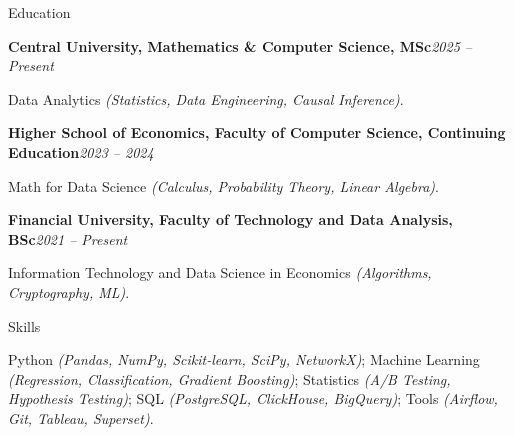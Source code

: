 \documentclass[]{mcdowellcv}
\renewenvironment{cvsubsection}[2]{%
  \begin{adjustwidth}{\subsectionmargin}{\subsectionmargin}%
    {\bfseries #1}\hfill #2\par\vspace{0.67em}%
}{%
  \end{adjustwidth}%
  \vspace*{\aftersubsectionspace}%
}
\begin{document}
	\begin{cvsection}{\Large Education}
		\begin{cvsubsection}{Central University, Mathematics \& Computer Science, MSc}{\textit{2025 -- Present}}
			\vspace{-3.1em}
			\begin{cvsubsection}{}{}
        		Data Analytics \textit{(Statistics, Data Engineering, Causal Inference)}.
			\end{cvsubsection}
		\end{cvsubsection}
		\begin{cvsubsection}{Higher School of Economics, Faculty of Computer Science, Continuing Education}{\textit{2023 -- 2024}}
			\vspace{-3.1em}
			\begin{cvsubsection}{}{}  
        		Math for Data Science \textit{(Calculus, Probability Theory, Linear Algebra)}.
			\end{cvsubsection}
		\end{cvsubsection}
		\begin{cvsubsection}{Financial University, Faculty of Technology and Data Analysis, BSc}{\textit{2021 -- Present}}
			\vspace{-3.1em}
			\begin{cvsubsection}{}{} 
        		Information Technology and Data Science in Economics \textit{(Algorithms, Cryptography, ML)}.
			\end{cvsubsection}
		\end{cvsubsection}
	\end{cvsection}
	
\begin{cvsection}{\Large Skills}
    \vspace{-1.55em}
    \begin{cvsubsection}{}{}
        Python \textit{(Pandas, NumPy, Scikit-learn, SciPy, NetworkX)};
        Machine Learning \textit{(Regression, Classification, Gradient Boosting)};
        Statistics \textit{(A/B Testing, Hypothesis Testing)};
        SQL \textit{(PostgreSQL, ClickHouse, BigQuery)};
        Tools \textit{(Airflow, Git, Tableau, Superset)}.
    \end{cvsubsection}
\end{cvsection}
	
\end{document}
